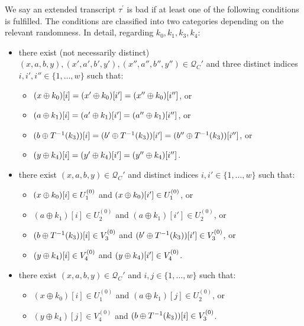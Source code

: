 \begin{definition}
\label{defn:bad-tau-4-rounds}

We say an extended transcript $\tau^{\prime}$ is bad if at least one of the following conditions is fulfilled. The conditions are classified into two categories depending on the relevant randomness. In detail, regarding $k_0,k_1,k_3,k_4$:
\begin{itemize}[leftmargin=10mm]
	\item[\bone] there exist (not necessarily distinct) $(x,a,b,y),(x',a',b',y'),(x'',a'',b'',y'')\in \mathcal{Q}_{C}'$ and three distinct indices $i, i', i'' \in \{1, \ldots, w\}$ such that:
	\begin{itemize}
		\item $(x\oplus k_0)[i]=(x'\oplus k_0)[i']=(x''\oplus k_0)[i'']$, or
		\item $(a\oplus k_1)[i]=(a'\oplus k_1)[i']=(a''\oplus k_1)[i'']$, or
		\item $(b\oplus T^{-1}(k_3))[i]=(b'\oplus T^{-1}(k_3))[i']=(b''\oplus T^{-1}(k_3))[i'']$, or
		\item $(y\oplus k_4)[i]=(y'\oplus k_4)[i']=(y''\oplus k_4)[i'']$.
	\end{itemize}
	\item[\btwo] there exist $(x,a,b,y) \in \mathcal{Q}_{C}'$ and distinct indices $i, i' \in \{1, \ldots, w\}$ such that:
	\begin{itemize}
		\item $(x\oplus k_0)[i]\in U_1^{(0)}$ and $(x\oplus k_0)[i']\in U_1^{(0)}$, or
		\item $(a \oplus k_1)[i]\in U_{2}^{(0)}$ and $(a \oplus k_1)[i']\in U_{2}^{(0)}$, or
		\item $(b\oplus T^{-1}(k_3))[i]\in V_3^{(0)}$ and
		$(b'\oplus T^{-1}(k_3))[i']\in V_3^{(0)}$, or
		\item $(y\oplus k_4)[i]\in V_4^{(0)}$ and $(y\oplus k_4)[i']\in V_4^{(0)}$.
	\end{itemize}
	\item[\bthree] there exist $(x,a,b,y) \in \mathcal{Q}_{C}'$ and $i, j \in \{1, \ldots, w\}$ such that:
	\begin{itemize}
		\item $\left(x \oplus k_{0}\right)[i]\in U_1^{(0)}$ and $\left(a\oplus k_{1}\right)[j]\in U_2^{(0)}$, or
		\item $\left(y \oplus k_{4}\right)[j]\in V_4^{(0)}$ and $(b\oplus T^{-1}(k_3)) [i]\in V_3^{(0)}$.

\end{itemize}
\end{itemize}
\end{definition}
